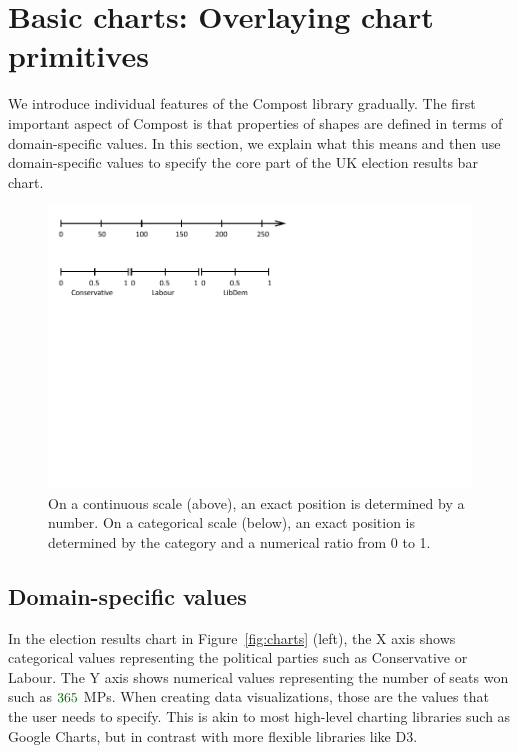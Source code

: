 \documentclass{jfp}
\newcommand{\num}[1]{\textcolor{numclr}{#1}}
\newcommand{\strf}[1]{\textnormal{\textcolor{strclr}{\sffamily #1}}}
\begin{document}
\section{Basic charts: Overlaying chart primitives}
We introduce individual features of the Compost library gradually. The first important aspect of
Compost is that properties of shapes are defined in terms of domain-specific values. In this
section, we explain what this means and then use domain-specific values to specify the core part of the
UK election results bar chart.

\begin{figure}[t]
\includegraphics[scale=1,trim={0cm 6.5cm 6cm 0cm},clip]{figures/values.pdf}
\caption{On a continuous scale (above), an exact position is determined by a number.
  On a categorical scale (below), an exact position is determined by the category and a
  numerical ratio from 0 to 1.}
\label{fig:scales}
\end{figure}

\subsection{Domain-specific values}

In the election results chart in Figure~\ref{fig:charts} (left), the X axis shows categorical
values representing the political parties such as \strf{Conservative} or \strf{Labour}. The
Y axis shows numerical values representing the number of seats won such as $\num{365}$ MPs.
When creating data visualizations, those are the values that the user needs to specify. This is
akin to most high-level charting libraries such as Google Charts, but in contrast with more
flexible libraries like D3.
\end{document}
